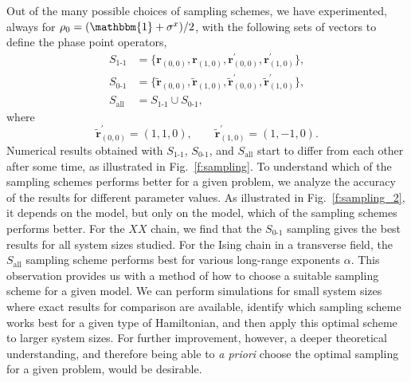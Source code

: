 \documentclass[aps,prl,showpacs,amsmath,amssymb,superscriptaddress,reprint,10pt]{revtex4-1}
\newcommand\id{{\mathbbm{1}}}
\newcommand{\mvec}[1]{\boldsymbol #1}
\begin{document}
Out of the many possible choices of sampling schemes, we have experimented, always for $\rho_0 = (\id+\sigma^x)/2$, with the following sets of vectors to define the phase point operators,
\begin{subequations}
\begin{align}
S_{\text{1-1}}&=\bigl\{\mvec{r}_{(0,0)},\mvec{r}_{(1,0)},\mvec{r}_{(0,0)}^\prime,\mvec{r}_{(1,0)}^\prime\bigr\},\label{e:S11}\\
S_{\text{0-1}}&=\bigl\{\tilde{\mvec{r}}_{(0,0)},\tilde{\mvec{r}}_{(1,0)},\tilde{\mvec{r}}_{(0,0)}^\prime,\tilde{\mvec{r}}_{(1,0)}^\prime\bigr\},\\
S_{\text{all}}&=S_{\text{1-1}}\cup S_{\text{0-1}},\label{e:Sall}
\end{align}
\end{subequations}
where
\begin{equation}
\tilde{\mvec{r}}_{(0,0)}^\prime=(1,1,0),\qquad \tilde{\mvec{r}}_{(1,0)}^\prime=(1,-1,0).
\end{equation}
Numerical results obtained with $S_{\text{1-1}}$, $S_{\text{0-1}}$, and $S_{\text{all}}$ start to differ from each other after some time, as illustrated in Fig.~\ref{f:sampling}. To understand which of the sampling schemes performs better for a given problem, we analyze the accuracy of the results for different parameter values. As illustrated in Fig.~\ref{f:sampling_2}, it depends on the model, but only on the model, which of the sampling schemes performs better. For the $XX$ chain, we find that the $S_{\text{0-1}}$ sampling gives the best results for all system sizes studied. For the Ising chain in a transverse field, the $S_{\text{all}}$ sampling scheme performs best for various long-range exponents $\alpha$. This observation provides us with a method of how to choose a suitable sampling scheme for a given model. We can perform simulations for small system sizes where exact results for comparison are available, identify which sampling scheme works best for a given type of Hamiltonian, and then apply this 
optimal scheme to larger system sizes. For further improvement, however, a deeper theoretical understanding, and therefore being able to {\em a priori}\/ choose the optimal sampling for a given problem, would be desirable.
\end{document}
